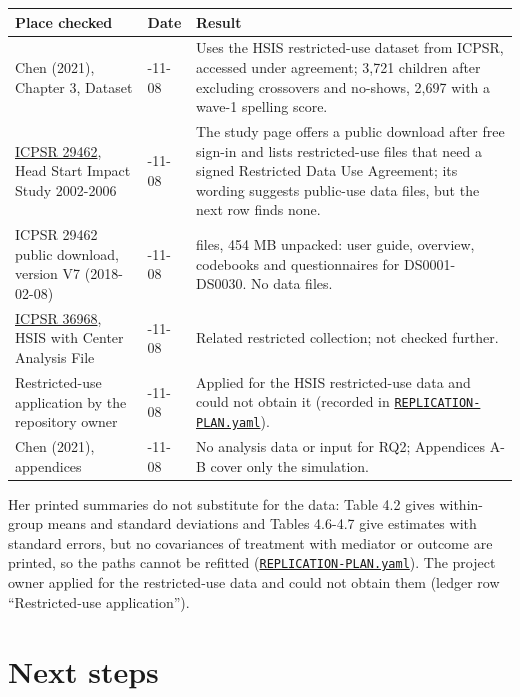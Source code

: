 {\footnotesize
\begin{longtable}{@{}>{\raggedright\arraybackslash}p{}>{\raggedright\arraybackslash}p{}>{\raggedright\arraybackslash}p{}@{}}
\toprule
Place checked & Date & Result\\
\midrule
Chen (2021), Chapter 3, Dataset & 2026-11-08 & Uses the HSIS restricted-use dataset from ICPSR, accessed under agreement; 3,721 children after excluding crossovers and no-shows, 2,697 with a wave-1 spelling score.\\
\href{https://www.icpsr.umich.edu/web/ICPSR/studies/29462}{ICPSR 29462}, Head Start Impact Study 2002-2006 & 2026-11-08 & The study page offers a public download after free sign-in and lists restricted-use files that need a signed Restricted Data Use Agreement; its wording suggests public-use data files, but the next row finds none.\\
ICPSR 29462 public download, version V7 (2018-02-08) & 2026-11-08 & 58 files, 454 MB unpacked: user guide, overview, codebooks and questionnaires for DS0001-DS0030. No data files.\\
\href{https://www.icpsr.umich.edu/web/ICPSR/studies/36968}{ICPSR 36968}, HSIS with Center Analysis File & 2026-11-08 & Related restricted collection; not checked further.\\
Restricted-use application by the repository owner & 2026-11-08 & Applied for the HSIS restricted-use data and could not obtain it (recorded in \href{https://github.com/alectionary/vibe-math/blob/master/formalization/chen-rdd-mediation/REPLICATION-PLAN.yaml}{\nolinkurl{REPLICATION-PLAN.yaml}}).\\
Chen (2021), appendices & 2026-11-08 & No analysis data or input for RQ2; Appendices A-B cover only the simulation.\\
\bottomrule
\end{longtable}}

Her printed summaries do not substitute for the data: Table 4.2 gives within-group means and standard deviations and Tables 4.6-4.7 give estimates with standard errors, but no covariances of treatment with mediator or outcome are printed, so the paths cannot be refitted (\href{https://github.com/alectionary/vibe-math/blob/master/formalization/chen-rdd-mediation/REPLICATION-PLAN.yaml}{\nolinkurl{REPLICATION-PLAN.yaml}}). The project owner applied for the restricted-use data and could not obtain them (ledger row ``Restricted-use application'').

\section{Next steps}\label{sec:next}

